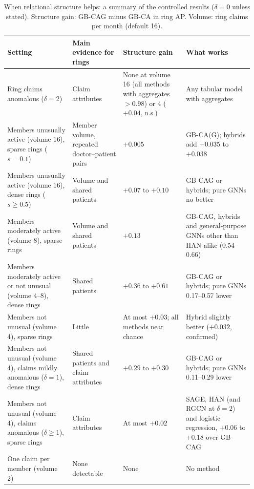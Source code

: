 \documentclass[pdflatex,sn-vancouver-num]{sn-jnl}
\begin{document}
\begin{table}[h]
\caption{When relational structure helps: a summary of the controlled results
($\delta=0$ unless stated). Structure gain: GB-CAG minus GB-CA in ring AP. Volume:
ring claims per month (default 16).}\label{tab:map}
\scriptsize
\setlength{\tabcolsep}{3pt}
\begin{tabular}{@{}>{\raggedright\arraybackslash}p{3.4cm}>{\raggedright\arraybackslash}p{2.6cm}>{\raggedright\arraybackslash}p{2.6cm}>{\raggedright\arraybackslash}p{3.4cm}@{}}
\toprule
Setting & Main evidence for rings & Structure gain & What works \\
\midrule
Ring claims anomalous ($\delta=2$) & Claim attributes & None at volume 16 (all methods with aggregates $>0.98$) or 4 ($+0.04$, n.s.) & Any tabular model with aggregates \\
\addlinespace[2pt]
Members unusually active (volume 16), sparse rings ($s=0.1$) & Member volume, repeated doctor--patient pairs & $+0.005$ & GB-CA(G); hybrids add $+0.035$ to $+0.038$ \\
\addlinespace[2pt]
Members unusually active (volume 16), dense rings ($s\ge0.5$) & Volume and shared patients & $+0.07$ to $+0.10$ & GB-CAG or hybrids; pure GNNs no better \\
\addlinespace[2pt]
Members moderately active (volume 8), sparse rings & Volume and shared patients & $+0.13$ & GB-CAG, hybrids and general-purpose GNNs other than HAN alike (0.54--0.66) \\
\addlinespace[2pt]
Members moderately active or not unusual (volume 4--8), dense rings & Shared patients & $+0.36$ to $+0.61$ & GB-CAG or hybrids; pure GNNs 0.17--0.57 lower \\
\addlinespace[2pt]
Members not unusual (volume 4), sparse rings & Little & At most $+0.03$; all methods near chance & Hybrid slightly better ($+0.032$, confirmed) \\
\addlinespace[2pt]
Members not unusual (volume 4), claims mildly anomalous ($\delta=1$), dense rings & Shared patients and claim attributes & $+0.29$ to $+0.30$ & GB-CAG or hybrids; pure GNNs 0.11--0.29 lower \\
\addlinespace[2pt]
Members not unusual (volume 4), claims anomalous ($\delta\ge1$), sparse rings & Claim attributes & At most $+0.02$ & SAGE, HAN (and RGCN at $\delta=2$) and logistic regression, $+0.06$ to $+0.18$ over GB-CAG \\
\addlinespace[2pt]
One claim per member (volume 2) & None detectable & None & No method \\

\end{tabular}
\end{table}
\end{document}
